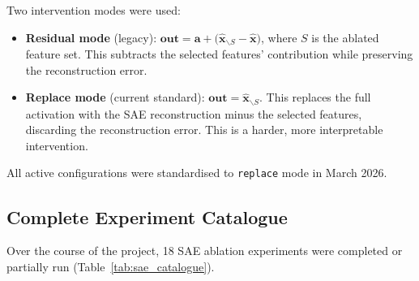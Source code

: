 \documentclass[11pt,a4paper]{article}
\begin{document}
Two intervention modes were used:
\begin{itemize}[noitemsep]
  \item \textbf{Residual mode} (legacy):
    $\mathbf{out} = \mathbf{a} + \bigl(\hat{\mathbf{x}}_{\backslash S} - \hat{\mathbf{x}}\bigr)$,
    where $S$ is the ablated feature set.
    This subtracts the selected features' contribution while preserving the reconstruction error.
  \item \textbf{Replace mode} (current standard):
    $\mathbf{out} = \hat{\mathbf{x}}_{\backslash S}$.
    This replaces the full activation with the SAE reconstruction minus the selected features,
    discarding the reconstruction error. This is a harder, more interpretable intervention.
\end{itemize}

All active configurations were standardised to \texttt{replace} mode in March 2026.

\subsection{Complete Experiment Catalogue}

Over the course of the project, 18 SAE ablation experiments were completed or partially run
(Table~\ref{tab:sae_catalogue}).
\end{document}
